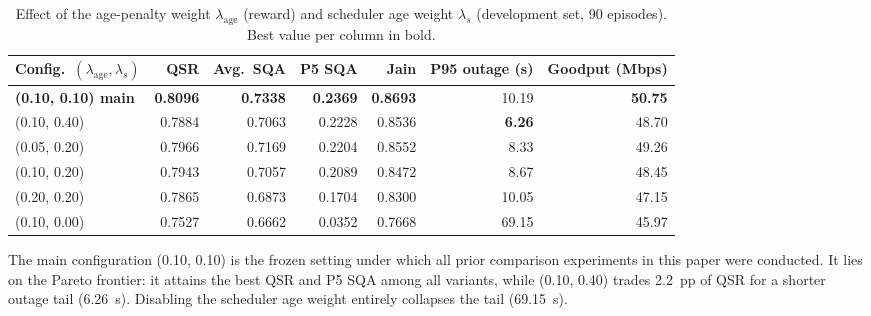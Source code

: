 \begin{table}[t]
\centering
\caption{Effect of the age-penalty weight $\lambda_{\mathrm{age}}$ (reward) and scheduler age weight $\lambda_s$ (development set, 90 episodes). Best value per column in bold.}
\label{tab:lambda}
\begin{tabular}{@{}lrrrrrr@{}}
\toprule
Config.\ $(\lambda_{\mathrm{age}},\lambda_s)$ & QSR & Avg.\ SQA & P5 SQA & Jain & P95 outage (s) & Goodput (Mbps) \\
\midrule
\textbf{(0.10, 0.10) main} & \textbf{0.8096} & \textbf{0.7338} & \textbf{0.2369} & \textbf{0.8693} & 10.19 & \textbf{50.75} \\
(0.10, 0.40) & 0.7884 & 0.7063 & 0.2228 & 0.8536 & \textbf{6.26} & 48.70 \\
(0.05, 0.20) & 0.7966 & 0.7169 & 0.2204 & 0.8552 & 8.33 & 49.26 \\
(0.10, 0.20) & 0.7943 & 0.7057 & 0.2089 & 0.8472 & 8.67 & 48.45 \\
(0.20, 0.20) & 0.7865 & 0.6873 & 0.1704 & 0.8300 & 10.05 & 47.15 \\
(0.10, 0.00) & 0.7527 & 0.6662 & 0.0352 & 0.7668 & 69.15 & 45.97 \\
\bottomrule
\end{tabular}
\begin{flushleft}\footnotesize
The main configuration (0.10, 0.10) is the frozen setting under which all prior comparison experiments in this paper were conducted. It lies on the Pareto frontier: it attains the best QSR and P5 SQA among all variants, while (0.10, 0.40) trades 2.2~pp of QSR for a shorter outage tail (6.26~s). Disabling the scheduler age weight entirely collapses the tail (69.15~s).
\end{flushleft}
\end{table}
